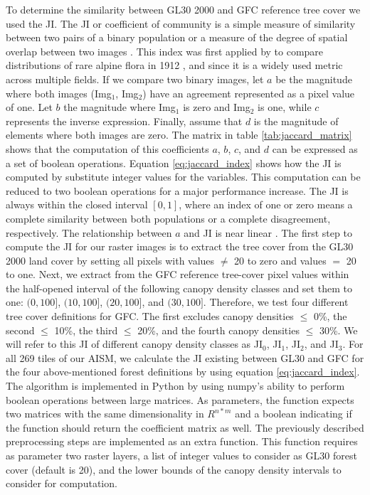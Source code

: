 			To determine the similarity between \ac{GL30} 2000 and \ac{GFC} reference tree cover we used the \ac{JI}. The \ac{JI} or coefficient of community is a simple measure of similarity between two pairs of a binary population or a measure of the degree of spatial overlap between two images \citep{Sampat2009}. This index was first applied by \citet{Jaccard1912} to compare distributions of rare alpine flora in 1912 \citep{Jaccard1912}, and since it is a widely used metric across multiple fields. If we compare two binary images, let $a$ be the magnitude where both images (Img$_1$, Img$_2$) have an agreement represented as a pixel value of one. Let $b$ the magnitude where Img$_1$ is zero and Img$_2$ is one, while $c$ represents the inverse expression. Finally, assume that $d$ is the magnitude of elements where both images are zero. The matrix in table \ref{tab:jaccard_matrix} shows that the computation of this coefficients $a$, $b$, $c$, and $d$ can be expressed as a set of boolean operations. Equation \ref{eq:jaccard_index} shows how the \ac{JI} is computed by substitute integer values for the variables. This computation can be reduced to two boolean operations for a major performance increase. The \ac{JI} is always within the closed interval $[0,1]$, where an index of one or zero means a complete similarity between both populations or a complete disagreement, respectively. The relationship between $a$ and \ac{JI} is near linear \citep{Shi1993}. The first step to compute the \ac{JI} for our raster images is to extract the tree cover from the \ac{GL30} 2000 land cover by setting all pixels with values $\neq$ 20 to zero and values $=$ 20 to one. Next, we extract from the \ac{GFC} reference tree-cover pixel values within the half-opened interval of the following canopy density classes and set them to one: $(0,100]$, $(10,100]$, $(20,100]$, and $(30,100]$. Therefore, we test four different tree cover definitions for \ac{GFC}. The first excludes canopy densities $\leq$ 0\%, the second $\leq$ 10\%, the third $\leq$ 20\%, and the fourth  canopy densities $\leq$ 30\%. We will refer to this \ac{JI} of different canopy density classes as JI$_0$, JI$_1$, JI$_2$, and JI$_3$. For all 269 tiles of our \ac{AISM}, we calculate the \ac{JI} existing between \ac{GL30} and \ac{GFC} for the four above-mentioned forest definitions by using equation \ref{eq:jaccard_index}. The algorithm is implemented in Python by using numpy's ability to perform boolean operations between large matrices. As parameters, the function expects two matrices with the same dimensionality in $R^{n*m}$ and a boolean indicating if the function should return the coefficient matrix as well. The previously described preprocessing steps are implemented as an extra function. This function requires as parameter two raster layers, a list of integer values to consider as \ac{GL30} forest cover (default is 20), and the lower bounds of the canopy density intervals to consider for computation.
